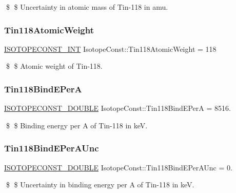 \$ \$ Uncertainty in atomic mass of Tin-\/118 in amu. \mbox{\label{group___isotope_const-_tin-_sn118_ga2b137df3ad4a45431a059873eaaf2e8b}} 
\subsubsection{\texorpdfstring{Tin118\+Atomic\+Weight}{Tin118AtomicWeight}}
{\footnotesize\ttfamily \mbox{\hyperlink{group___isotope_const-_macros_ga5f18360b3e99483a35c32d789e62621c}{I\+S\+O\+T\+O\+P\+E\+C\+O\+N\+S\+T\+\_\+\+I\+NT}} Isotope\+Const\+::\+Tin118\+Atomic\+Weight = 118}

\$ \$ Atomic weight of Tin-\/118. \mbox{\label{group___isotope_const-_tin-_sn118_gaab65b6361170b096b178985e8f3d72b5}} 
\subsubsection{\texorpdfstring{Tin118\+Bind\+E\+PerA}{Tin118BindEPerA}}
{\footnotesize\ttfamily \mbox{\hyperlink{group___isotope_const-_macros_ga8f45a7272ce02c0b4c65c44636ed719a}{I\+S\+O\+T\+O\+P\+E\+C\+O\+N\+S\+T\+\_\+\+D\+O\+U\+B\+LE}} Isotope\+Const\+::\+Tin118\+Bind\+E\+PerA = 8516.}

\$ \$ Binding energy per A of Tin-\/118 in keV. \mbox{\label{group___isotope_const-_tin-_sn118_ga99c019c0b95977e6114c3e1a74ef9b4a}} 
\subsubsection{\texorpdfstring{Tin118\+Bind\+E\+Per\+A\+Unc}{Tin118BindEPerAUnc}}
{\footnotesize\ttfamily \mbox{\hyperlink{group___isotope_const-_macros_ga8f45a7272ce02c0b4c65c44636ed719a}{I\+S\+O\+T\+O\+P\+E\+C\+O\+N\+S\+T\+\_\+\+D\+O\+U\+B\+LE}} Isotope\+Const\+::\+Tin118\+Bind\+E\+Per\+A\+Unc = 0.}

\$ \$ Uncertainty in binding energy per A of Tin-\/118 in keV. \mbox{\label{group___isotope_const-_tin-_sn118_ga080ea606821814618016c8a120207eff}} 
